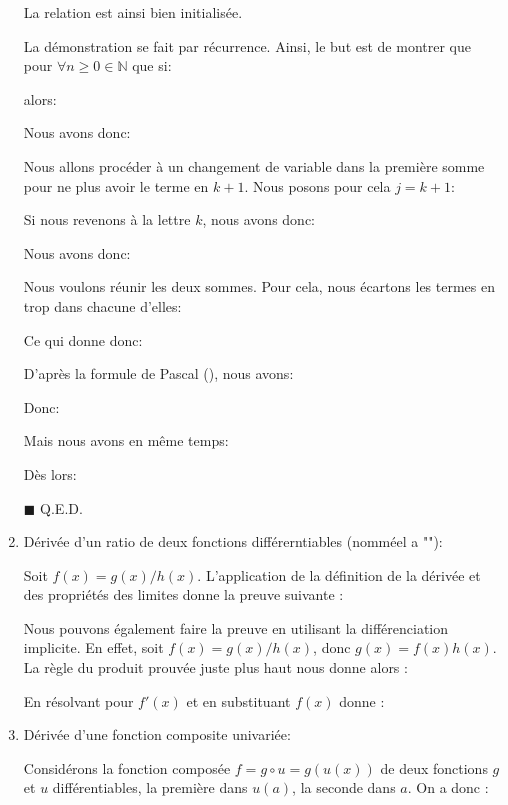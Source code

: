 \begin{enumerate}
\begin{dem}
		 	La relation est ainsi bien initialisée.
		 	
		 	La démonstration se fait par récurrence. Ainsi, le but est de montrer que pour $\forall n \geq 0 \in \mathbb{N}$ que si:
		 	
		 	alors:
		 	
		 	Nous avons donc:
		 	
		 	Nous allons procéder à un changement de variable dans la première somme pour ne plus avoir le terme en $k + 1$. Nous posons pour cela $j=k+1$:
		 	
		 	Si nous revenons à la lettre $k$, nous avons donc:
		 	
		 	Nous avons donc:
		 	
		 	Nous voulons réunir les deux sommes. Pour cela, nous écartons les termes en trop dans chacune d'elles:
		 	
		 	Ce qui donne donc:
		 	
		 	D'après la formule de Pascal (), nous avons:
		 	
		 	Donc:
		 	
		 	Mais nous avons en même temps:
		 	
		 	Dès lors:
		 	
		 	\begin{flushright}
				$\blacksquare$  Q.E.D.
			\end{flushright}
		 \end{dem}
		 
		 \item Dérivée d'un ratio de deux fonctions différerntiables (nomméel a  "\label{quotient rule}"):
		 
		 Soit $f(x)=g(x)/h(x)$. L'application de la définition de la dérivée et des propriétés des limites donne la preuve suivante :
		 
		 Nous pouvons également faire la preuve en utilisant la différenciation implicite. En effet, soit $f(x)=g(x)/h(x)$, donc $g(x)=f(x)h(x)$. La règle du produit prouvée juste plus haut nous donne alors :
		
		En résolvant pour $f'(x)$ et en substituant $f(x)$ donne :
		
		 
		 \item Dérivée d'une fonction composite univariée:
		 
		 Considérons la fonction composée $f=g \circ u=g(u(x))$ de deux fonctions $g$ et $u$ différentiables, la première dans $u(a)$, la seconde dans $a$. On a donc :
		 

\end{enumerate}
